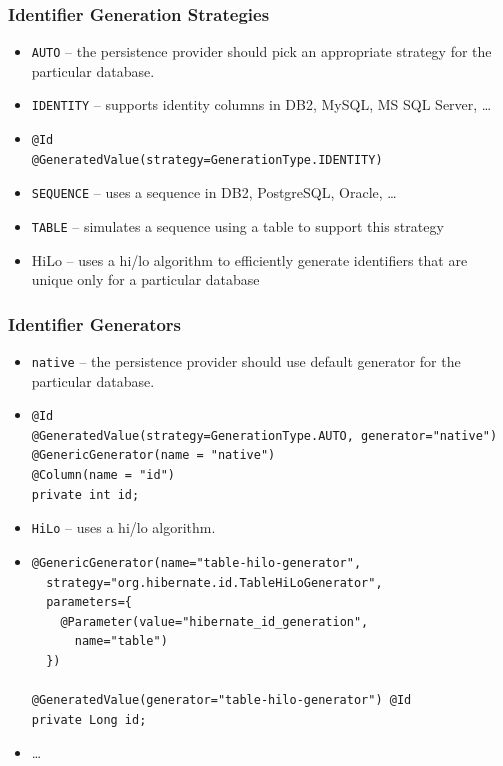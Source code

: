 \documentclass[10pt,xcolor=pdflatex]{beamer}
\begin{document}
\begin{frame}[fragile]\frametitle{Identifier Generation Strategies}
	\begin{itemize}
		\item \texttt{AUTO} -- the persistence provider should pick an appropriate strategy for the particular database.
        \item \texttt{IDENTITY} -- supports identity columns in DB2, MySQL, MS SQL Server, \ldots
        \item[] \begin{verbatim}
@Id 
@GeneratedValue(strategy=GenerationType.IDENTITY)
\end{verbatim}
        \item \texttt{SEQUENCE} -- uses a sequence in DB2, PostgreSQL, Oracle, \ldots
        \item \texttt{TABLE} -- simulates a sequence using a table to support this strategy
        \item HiLo -- uses a hi/lo algorithm to efficiently generate identifiers that are unique only for a particular database
	\end{itemize}
\end{frame}


\begin{frame}[fragile]\frametitle{Identifier Generators}
	\begin{itemize}
		\item \texttt{native} -- the persistence provider should use default generator for the particular database.
        \item[] \begin{footnotesize} \begin{verbatim}
@Id
@GeneratedValue(strategy=GenerationType.AUTO, generator="native")
@GenericGenerator(name = "native")
@Column(name = "id")
private int id;
\end{verbatim} \end{footnotesize}
        \item \texttt{HiLo} --  uses a hi/lo algorithm.
        \item[] \begin{footnotesize}\begin{verbatim}
@GenericGenerator(name="table-hilo-generator",
  strategy="org.hibernate.id.TableHiLoGenerator",
  parameters={
    @Parameter(value="hibernate_id_generation",
      name="table")
  })
  
@GeneratedValue(generator="table-hilo-generator") @Id 
private Long id;
\end{verbatim} \end{footnotesize}
        \item \ldots
	\end{itemize}
\end{frame}
\end{document}
